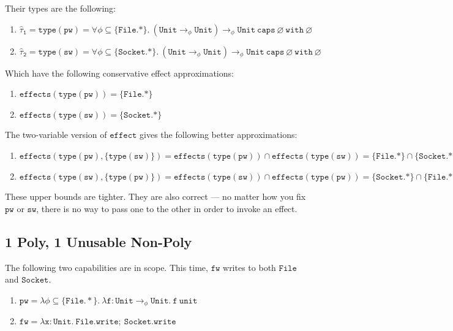 \documentclass{llncs}
\newcommand{\keywadj}[1]{\mathtt{#1}}
\newcommand{\kwa}[1]{\keywadj{ #1 }}
\newcommand{\unit}[0]{ \kwa{unit} }
\newcommand{\Unit}[0]{ \kwa{Unit} }
\begin{document}
\noindent
Their types are the following:

\begin{enumerate}
	\item $\kwa{\hat \tau_1 = type(pw) = \forall \phi \subseteq \{ File.* \}.~(Unit \rightarrow_{\phi} Unit) \rightarrow_{\phi} Unit~caps~\varnothing~with~\varnothing}$
	\item $\kwa{\hat \tau_2 = type(sw) = \forall \phi \subseteq \{ Socket.* \}.~(Unit \rightarrow_{\phi} Unit) \rightarrow_{\phi} Unit~caps~\varnothing~with~\varnothing}$
\end{enumerate}

\noindent
Which have the following conservative effect approximations:

\begin{enumerate}
	\item $\kwa{effects(type(pw)) = \{File.*\} }$
	\item $\kwa{effects(type(sw)) = \{Socket.*\} }$
\end{enumerate}

\noindent
The two-variable version of $\kwa{effect}$ gives the following better approximations:

\begin{enumerate}
	\item $\kwa{effects(type(pw), \{ type(sw) \}) = effects(type(pw)) \cap effects(type(sw)) = \{ File.* \} \cap \{ Socket.* \} = \varnothing}$
	\item $\kwa{effects(type(sw), \{ type(pw) \}) = effects(type(sw)) \cap effects(type(pw)) = \{ Socket.* \} \cap \{ File.* \} = \varnothing}$
\end{enumerate}

\noindent
These upper bounds are tighter. They are also correct --- no matter how you fix $\kwa{pw}$ or $\kwa{sw}$, there is no way to pass one to the other in order to invoke an effect.

\subsection{1 Poly, 1 Unusable Non-Poly}

\noindent
The following two capabilities are in scope. This time, $\kwa{fw}$ writes to both $\kwa{File}$ and $\kwa{Socket}$.

\begin{enumerate}
	\item $\kwa{pw = \lambda \phi \subseteq \{\kwa{File.*}\}. ~\lambda f: \Unit \rightarrow_{\phi} \Unit. ~f ~\unit}$
	\item $\kwa{fw = \lambda x: Unit.~File.write;~Socket.write}$
\end{enumerate}
\end{document}
